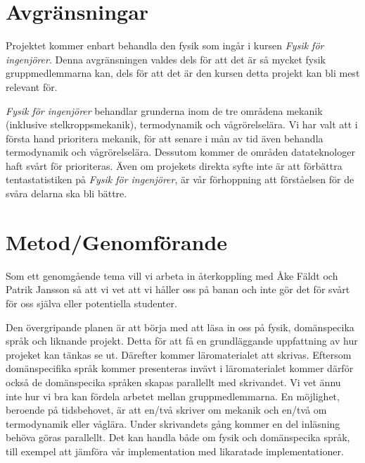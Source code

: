 \documentclass[12pt,a4paper]{article}
\begin{document}
\section{Avgränsningar}

Projektet kommer enbart behandla den fysik som ingår i kursen \textit{Fysik för
ingenjörer}. Denna avgränsningen valdes dels för att det är så mycket fysik
gruppmedlemmarna kan, dels för att det är den kursen detta projekt kan bli mest
relevant för.

\textit{Fysik för ingenjörer} behandlar grunderna inom de tre områdena mekanik
(inklusive stelkroppsmekanik), termodynamik och vågrörelselära. Vi har valt att
i första hand prioritera mekanik, för att senare i mån av tid även behandla
termodynamik och vågrörelselära. Dessutom kommer de områden datateknologer haft
svårt för prioriteras. Även om projekets direkta syfte inte är att förbättra
tentastatistiken på \textit{Fysik för ingenjörer}, är vår förhoppning att
förståelsen för de svåra delarna ska bli bättre.




\section{Metod/Genomförande}

Som ett genomgående tema vill vi arbeta in återkoppling med Åke Fäldt och Patrik
Jansson så att vi vet att vi håller oss på banan och inte gör det för svårt för
oss själva eller potentiella studenter.

Den övergripande planen är att börja med att läsa in oss på fysik, domänspecika
språk och liknande projekt. Detta för att få en grundläggande uppfattning av hur
projeket kan tänkas se ut. Därefter kommer läromaterialet att skrivas. Eftersom
domänspecifika språk kommer presenteras invävt i läromaterialet kommer därför
också de domänspecika språken skapas parallellt med skrivandet. Vi vet ännu inte
hur vi bra kan fördela arbetet mellan gruppmedlemmarna. En möjlighet, beroende
på tidsbehovet, är att en/två skriver om mekanik och en/två om termodynamik
eller våglära. Under skrivandets gång kommer en del inläsning behöva göras
parallellt. Det kan handla både om fysik och domänspecika språk, till exempel
att jämföra vår implementation med likaratade implementationer.
\end{document}
